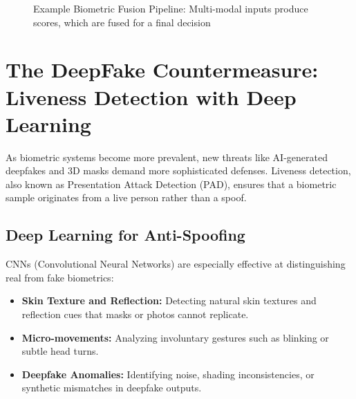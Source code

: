 \documentclass[12pt,a4paper]{report}
\begin{document}
\begin{figure}[h!]
    \centering
    \caption{Example Biometric Fusion Pipeline: Multi-modal inputs produce scores, which are fused for a final decision}
    \label{fig:fusionpipeline}
\end{figure}

\section{The DeepFake Countermeasure: Liveness Detection with Deep Learning}

As biometric systems become more prevalent, new threats like AI-generated deepfakes and 3D masks demand more sophisticated defenses. Liveness detection, also known as Presentation Attack Detection (PAD), ensures that a biometric sample originates from a live person rather than a spoof.

\subsection{Deep Learning for Anti-Spoofing}

CNNs (Convolutional Neural Networks) are especially effective at distinguishing real from fake biometrics:

\begin{itemize}
    \item \textbf{Skin Texture and Reflection:} Detecting natural skin textures and reflection cues that masks or photos cannot replicate. 
    \item \textbf{Micro-movements:} Analyzing involuntary gestures such as blinking or subtle head turns.
    \item \textbf{Deepfake Anomalies:} Identifying noise, shading inconsistencies, or synthetic mismatches in deepfake outputs.
\end{itemize}
\end{document}
